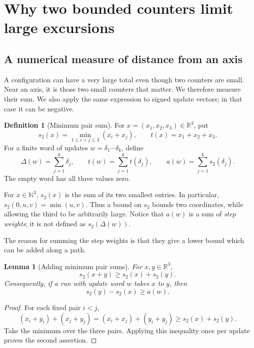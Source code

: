 \documentclass[11pt,a4paper]{article}
\newtheorem{lemma}[theorem]{Lemma}
\theoremstyle{definition}
\newtheorem{definition}[theorem]{Definition}
\theoremstyle{remark}
\newcommand{\N}{\mathbb N}
\newcommand{\Z}{\mathbb Z}
\begin{document}
\section{Why two bounded counters limit large excursions}\label{sec:pair-rigorous}

\subsection{A numerical measure of distance from an axis}

A configuration can have a very large total even though two counters
are small. Near an axis, it is those two small counters that matter.
We therefore measure their sum. We also apply the same expression to
signed update vectors; in that case it can be negative.

\begin{definition}[Minimum pair sum]\label{def:minimum-pair}
For \(x=(x_1,x_2,x_3)\in\mathbb R^3\), put
\[
 s_2(x)=\min_{1\le i<j\le3}(x_i+x_j),
 \qquad t(x)=x_1+x_2+x_3.
\]
For a finite word of updates \(w=\delta_1\cdots\delta_k\), define
\[
 \Delta(w)=\sum_{j=1}^k\delta_j,\qquad
 t(w)=\sum_{j=1}^k t(\delta_j),\qquad
 a(w)=\sum_{j=1}^k s_2(\delta_j).
\]
The empty word has all three values zero.
\end{definition}

For \(x\in\N^3\), \(s_2(x)\) is the sum of its two smallest entries.
In particular, \(s_2(0,u,v)=\min(u,v)\).
Thus a bound on \(s_2\) bounds two coordinates, while allowing the third
to be arbitrarily large. Notice that \(a(w)\) is a sum of
\emph{step weights}; it is not defined as \(s_2(\Delta(w))\).

The reason for summing the step weights is that they give a lower bound
which can be added along a path.

\begin{lemma}[Adding minimum pair sums]\label{lem:pair-superadditive}
For \(x,y\in\mathbb R^3\),
\[
 s_2(x+y)\ge s_2(x)+s_2(y).
\]
Consequently, if a run with update word \(w\) takes \(x\) to \(y\), then
\[
 s_2(y)-s_2(x)\ge a(w).
\]
\end{lemma}
\begin{proof}
For each fixed pair \(i<j\),
\[
 (x_i+y_i)+(x_j+y_j)
   =(x_i+x_j)+(y_i+y_j)
   \ge s_2(x)+s_2(y).
\]
Take the minimum over the three pairs. Applying this inequality once
per update proves the second assertion.
\end{proof}
\end{document}
